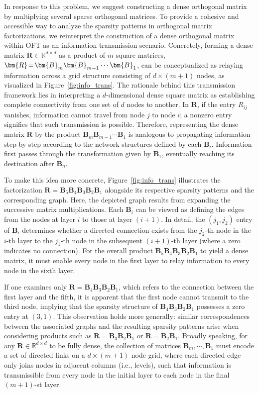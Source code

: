 In response to this problem, we suggest constructing a dense orthogonal matrix by multiplying several sparse orthogonal matrices. To provide a cohesive and accessible way to analyze the sparsity patterns in orthogonal matrix factorizations, we reinterpret the construction of a dense orthogonal matrix within OFT as an information transmission scenario. Concretely, forming a dense matrix $\bm{R}\in\mathbb{R}^{d\times d}$ as a product of $m$ square matrices, $\thickmuskip=2mu \medmuskip=2mu \bm{R}=\bm{B}_m\bm{B}_{m-1}\cdots\bm{B}_1$, can be conceptualized as relaying information across a grid structure consisting of $d\times (m+1)$ nodes, as visualized in Figure~\ref{fig:info_trans}. The rationale behind this transmission framework lies in interpreting a $d$-dimensional dense square matrix as establishing complete connectivity from one set of $d$ nodes to another. In $\bm{R}$, if the entry $R_{ij}$ vanishes, information cannot travel from node $j$ to node $i$; a nonzero entry signifies that such transmission is possible. Therefore, representing the dense matrix $\bm{R}$ by the product $\bm{B}_m\bm{B}_{m-1}\cdots\bm{B}_1$ is analogous to propagating information step-by-step according to the network structures defined by each $\bm{B}_i$. Information first passes through the transformation given by $\bm{B}_1$, eventually reaching its destination after $\bm{B}_n$. 

To make this idea more concrete, Figure~\ref{fig:info_trans} illustrates the factorization $\bm{R}=\bm{B}_5\bm{B}_4\bm{B}_3\bm{B}_2\bm{B}_1$ alongside its respective sparsity patterns and the corresponding graph. Here, the depicted graph results from expanding the successive matrix multiplications. Each $\bm{B}_i$ can be viewed as defining the edges from the nodes at layer $i$ to those at layer $(i+1)$. In detail, the $(j_1,j_2)$ entry of $\bm{B}_i$ determines whether a directed connection exists from the $j_2$-th node in the $i$-th layer to the $j_1$-th node in the subsequent $(i+1)$-th layer (where a zero indicates no connection). For the overall product $\bm{B}_5\bm{B}_4\bm{B}_3\bm{B}_2\bm{B}_1$ to yield a dense matrix, it must enable every node in the first layer to relay information to every node in the sixth layer. 

If one examines only $\bm{R}=\bm{B}_4\bm{B}_3\bm{B}_2\bm{B}_1$, which refers to the connection between the first layer and the fifth, it is apparent that the first node cannot transmit to the third node, implying that the sparsity structure of $\bm{B}_4\bm{B}_3\bm{B}_2\bm{B}_1$ possesses a zero entry at $(3,1)$. This observation holds more generally: similar correspondences between the associated graphs and the resulting sparsity patterns arise when considering products such as $\bm{R}=\bm{B}_3\bm{B}_2\bm{B}_1$ or $\bm{R}=\bm{B}_2\bm{B}_1$. Broadly speaking, for any $\bm{R}\in\mathbb{R}^{d\times d}$ to be fully dense, the collection of matrices $\bm{B}_m,\cdots,\bm{B}_1$ must encode a set of directed links on a $d\times(m+1)$ node grid, where each directed edge only joins nodes in adjacent columns (i.e., levels), such that information is transmissible from every node in the initial layer to each node in the final $(m+1)$-st layer.

